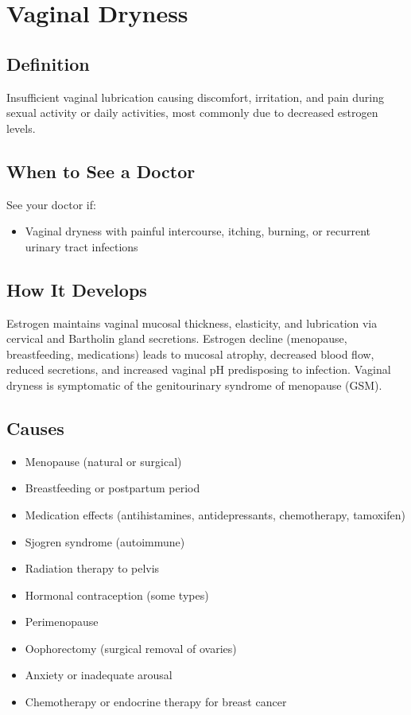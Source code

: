 \chapter{Vaginal Dryness}

\section*{Definition}
Insufficient vaginal lubrication causing discomfort, irritation, and pain during sexual activity or daily activities, most commonly due to decreased estrogen levels.

\section*{When to See a Doctor}
See your doctor if:
\begin{itemize}
  \item Vaginal dryness with painful intercourse, itching, burning, or recurrent urinary tract infections
\end{itemize}

\section*{How It Develops}
Estrogen maintains vaginal mucosal thickness, elasticity, and lubrication via cervical and Bartholin gland secretions. Estrogen decline (menopause, breastfeeding, medications) leads to mucosal atrophy, decreased blood flow, reduced secretions, and increased vaginal pH predisposing to infection. Vaginal dryness is symptomatic of the genitourinary syndrome of menopause (GSM).

\section*{Causes}
\begin{itemize}
  \item Menopause (natural or surgical)
  \item Breastfeeding or postpartum period
  \item Medication effects (antihistamines, antidepressants, chemotherapy, tamoxifen)
  \item Sjogren syndrome (autoimmune)
  \item Radiation therapy to pelvis
  \item Hormonal contraception (some types)
  \item Perimenopause
  \item Oophorectomy (surgical removal of ovaries)
  \item Anxiety or inadequate arousal
  \item Chemotherapy or endocrine therapy for breast cancer
\end{itemize}

